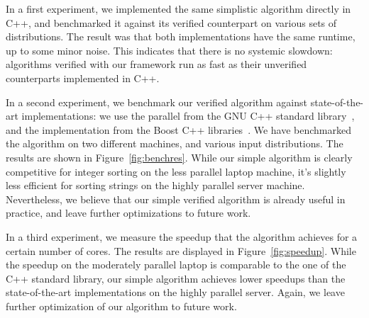 \documentclass[runningheads]{llncs}
\begin{document}
  In a first experiment, we implemented the same simplistic algorithm directly in C++, and benchmarked it
  against its verified counterpart on various sets of distributions.
  The result was that both implementations have the same runtime, up to some minor noise.
  This indicates that there is no systemic slowdown: algorithms verified with our framework run as fast as their unverified counterparts implemented in C++.

  In a second experiment, we benchmark our verified algorithm against state-of-the-art implementations:
  we use the parallel  from the GNU C++ standard library~\cite{libstdc++}, and the
   implementation from the Boost C++ libraries~\cite{boost}.
  We have benchmarked the algorithm on two different machines, and various input distributions. The results are shown in Figure~\ref{fig:benchres}.
  While our simple algorithm is clearly competitive for integer sorting on the less parallel laptop
  machine, it's slightly less efficient for sorting strings on the highly parallel server machine.
  Nevertheless, we believe that our simple verified algorithm is already useful in practice,
  and leave further optimizations to future work.

  In a third experiment, we measure the speedup that the algorithm achieves for a certain number of cores.
  The results are displayed in Figure~\ref{fig:speedup}. While the speedup on the moderately parallel
  laptop is comparable to the one of the C++ standard library, our simple algorithm
  achieves lower speedups than the state-of-the-art implementations on the highly parallel server.
  Again, we leave further optimization of our algorithm to future work.


\end{document}
